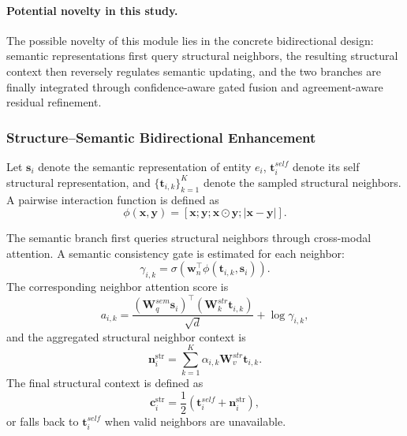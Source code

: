 \paragraph{Potential novelty in this study.}
The possible novelty of this module lies in the concrete bidirectional design: semantic representations first query structural neighbors, the resulting structural context then reversely regulates semantic updating, and the two branches are finally integrated through confidence-aware gated fusion and agreement-aware residual refinement.

\subsubsection{Structure--Semantic Bidirectional Enhancement}

Let $\mathbf{s}_i$ denote the semantic representation of entity $e_i$, $\mathbf{t}_i^{self}$ denote its self structural representation, and $\{\mathbf{t}_{i,k}\}_{k=1}^{K}$ denote the sampled structural neighbors. A pairwise interaction function is defined as
\begin{equation}
\phi(\mathbf{x}, \mathbf{y})
=
[\mathbf{x};\mathbf{y};\mathbf{x}\odot\mathbf{y};|\mathbf{x}-\mathbf{y}|].
\end{equation}

The semantic branch first queries structural neighbors through cross-modal attention. A semantic consistency gate is estimated for each neighbor:
\begin{equation}
\gamma_{i,k}
=
\sigma\!\left(
\mathbf{w}_{n}^{\top}\phi(\mathbf{t}_{i,k}, \mathbf{s}_i)
\right).
\end{equation}
The corresponding neighbor attention score is
\begin{equation}
a_{i,k}
=
\frac{
(\mathbf{W}_{q}^{sem}\mathbf{s}_i)^{\top}
(\mathbf{W}_{k}^{str}\mathbf{t}_{i,k})
}{\sqrt{d}}
+
\log \gamma_{i,k},
\end{equation}
and the aggregated structural neighbor context is
\begin{equation}
\mathbf{n}_i^{\mathrm{str}}
=
\sum_{k=1}^{K}\alpha_{i,k}\mathbf{W}_{v}^{str}\mathbf{t}_{i,k}.
\end{equation}
The final structural context is defined as
\begin{equation}
\mathbf{c}_i^{\mathrm{str}}
=
\frac{1}{2}
\left(
\mathbf{t}_i^{self}
+
\mathbf{n}_i^{\mathrm{str}}
\right),
\end{equation}
or falls back to $\mathbf{t}_i^{self}$ when valid neighbors are unavailable.

